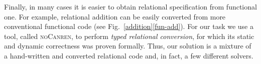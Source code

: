 Finally, in many cases it is easier to obtain relational specification from functional one. For example,
relational addition can be easily converted from more conventional functional code (see Fig.~\ref{addition}\ref{fun-add}).
For our task we use a tool, called \textsc{noCanren}, to perform \emph{typed relational conversion}\cite{lozov2017typed}, for which its static and dynamic
correctness was proven formally. Thus, our solution is a mixture of a hand-written and converted relational code and, in fact, a few
different solvers.


